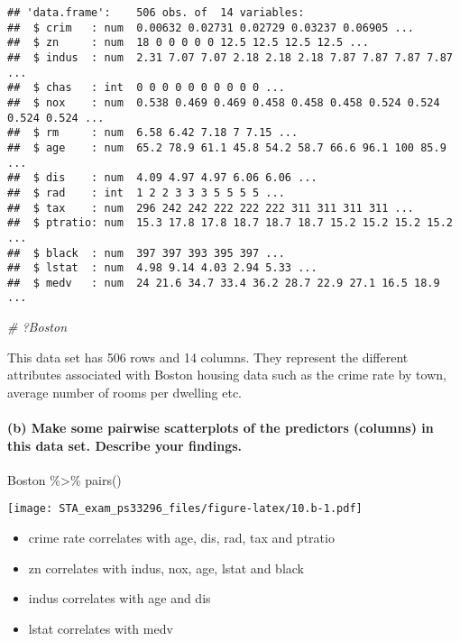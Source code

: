\documentclass[
]{article}
\newenvironment{Shaded}{\begin{snugshade}}{\end{snugshade}}
\newcommand{\CommentTok}[1]{\textcolor[rgb]{0.56,0.35,0.01}{\textit{#1}}}
\newcommand{\FunctionTok}[1]{\textcolor[rgb]{0.00,0.00,0.00}{#1}}
\newcommand{\NormalTok}[1]{#1}
\newcommand{\SpecialCharTok}[1]{\textcolor[rgb]{0.00,0.00,0.00}{#1}}
\providecommand{\tightlist}{%
  \setlength{\itemsep}{0pt}\setlength{\parskip}{0pt}}
\begin{document}
\begin{verbatim}
## 'data.frame':    506 obs. of  14 variables:
##  $ crim   : num  0.00632 0.02731 0.02729 0.03237 0.06905 ...
##  $ zn     : num  18 0 0 0 0 0 12.5 12.5 12.5 12.5 ...
##  $ indus  : num  2.31 7.07 7.07 2.18 2.18 2.18 7.87 7.87 7.87 7.87 ...
##  $ chas   : int  0 0 0 0 0 0 0 0 0 0 ...
##  $ nox    : num  0.538 0.469 0.469 0.458 0.458 0.458 0.524 0.524 0.524 0.524 ...
##  $ rm     : num  6.58 6.42 7.18 7 7.15 ...
##  $ age    : num  65.2 78.9 61.1 45.8 54.2 58.7 66.6 96.1 100 85.9 ...
##  $ dis    : num  4.09 4.97 4.97 6.06 6.06 ...
##  $ rad    : int  1 2 2 3 3 3 5 5 5 5 ...
##  $ tax    : num  296 242 242 222 222 222 311 311 311 311 ...
##  $ ptratio: num  15.3 17.8 17.8 18.7 18.7 18.7 15.2 15.2 15.2 15.2 ...
##  $ black  : num  397 397 393 395 397 ...
##  $ lstat  : num  4.98 9.14 4.03 2.94 5.33 ...
##  $ medv   : num  24 21.6 34.7 33.4 36.2 28.7 22.9 27.1 16.5 18.9 ...
\end{verbatim}

\begin{Shaded}
\begin{Highlighting}[]
\CommentTok{\# ?Boston}
\end{Highlighting}
\end{Shaded}

This data set has 506 rows and 14 columns. They represent the different
attributes associated with Boston housing data such as the crime rate by
town, average number of rooms per dwelling etc.

\hypertarget{b-make-some-pairwise-scatterplots-of-the-predictors-columns-in-this-data-set.-describe-your-findings.}{%
\paragraph{(b) Make some pairwise scatterplots of the predictors
(columns) in this data set. Describe your
findings.}\label{b-make-some-pairwise-scatterplots-of-the-predictors-columns-in-this-data-set.-describe-your-findings.}}

\begin{Shaded}
\begin{Highlighting}[]
\NormalTok{Boston }\SpecialCharTok{\%\textgreater{}\%} \FunctionTok{pairs}\NormalTok{()}
\end{Highlighting}
\end{Shaded}

\texttt{[image: STA\_exam\_ps33296\_files/figure-latex/10.b-1.pdf]}

\begin{itemize}
\tightlist
\item
  crime rate correlates with age, dis, rad, tax and ptratio
\item
  zn correlates with indus, nox, age, lstat and black
\item
  indus correlates with age and dis
\item
  lstat correlates with medv
\end{itemize}
\end{document}

